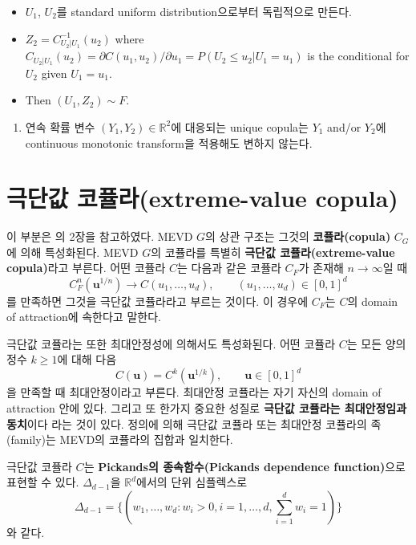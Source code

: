 \documentclass[b5paper,]{scrbook}
\providecommand{\tightlist}{%
  \setlength{\itemsep}{0pt}\setlength{\parskip}{0pt}}
\theoremstyle{plain}
\theoremstyle{definition}
\numberwithin{equation}{section}
\begin{document}
\begin{itemize}
\item
  \(U_{1}\), \(U_{2}\)를 standard uniform distribution으로부터 독립적으로 만든다.
\item
  \(Z_{2}=C_{U_{2}|U_{1}}^{-1}(u_{2})\) where \(C_{U_{2}|U_{1}}(u_{2})=\partial C(u_{1}, u_{2})/\partial u_{1}= P(U_{2}\leq u_{2}|U_{1}=u_{1})\) is the conditional for \(U_{2}\) given \(U_{1}=u_{1}\).
\item
  Then \((U_{1}, Z_{2})\sim F\).
\end{itemize}

\begin{enumerate}
\def\labelenumi{\arabic{enumi}.}
\setcounter{enumi}{4}
\tightlist
\item
  연속 확률 변수 \((Y_{1}, Y_{2})\in\mathbb{R}^{2}\)에 대응되는 unique copula는 \(Y_{1}\) and/or \(Y_{2}\)에 continuous monotonic transform을 적용해도 변하지 않는다.
\end{enumerate}

\hypertarget{-extreme-value-copula}{%
\section{극단값 코퓰라(extreme-value copula)}\label{-extreme-value-copula}}

이 부분은 \citep{Dey2015}의 2장을 참고하였다. MEVD \(G\)의 상관 구조는 그것의 \textbf{코퓰라(copula)} \(C_{G}\)에 의해 특성화된다. MEVD \(G\)의 코퓰라를 특별히 \textbf{극단값 코퓰라(extreme-value copula)}라고 부른다. 어떤 코퓰라 \(C\)는 다음과 같은 코퓰라 \(C_{F}\)가 존재해 \(n\rightarrow\infty\)일 때
\[C_{F}^{n}(\mathbf{u}^{1/n})\rightarrow C(u_{1},\ldots, u_{d}), \qquad{(u_{1}, \ldots, u_{d})\in [0,1]^{d}}\]
를 만족하면 그것을 극단값 코퓰라라고 부르는 것이다. 이 경우에 \(C_{F}\)는 \(C\)의 domain of attraction에 속한다고 말한다.

극단값 코퓰라는 또한 최대안정성에 의해서도 특성화된다. 어떤 코퓰라 \(C\)는 모든 양의정수 \(k\geq 1\)에 대해 다음
\[C(\mathbf{u})=C^{k}(\mathbf{u}^{1/k}),\qquad{\mathbf{u}\in[0,1]^{d}}\]
을 만족할 때 최대안정이라고 부른다. 최대안정 코퓰라는 자기 자신의 domain of attraction 안에 있다. 그리고 또 한가지 중요한 성질로 \textbf{극단값 코퓰라는 최대안정임과 동치}이다 라는 것이 있다. 정의에 의해 극단값 코퓰라 또는 최대안정 코퓰라의 족(family)는 MEVD의 코퓰라의 집합과 일치한다.

극단값 코퓰라 \(C\)는 \textbf{Pickands의 종속함수(Pickands dependence function)}으로 표현할 수 있다. \(\Delta_{d-1}\)을 \(\mathbb{R}^{d}\)에서의 단위 심플렉스로
\[\Delta_{d-1} = \{ (w_{1},\ldots, w_{d}: w_{i}>0, i=1,\ldots, d, \sum_{i=1}^{d}w_{i}=1) \}\]
와 같다.
\end{document}

